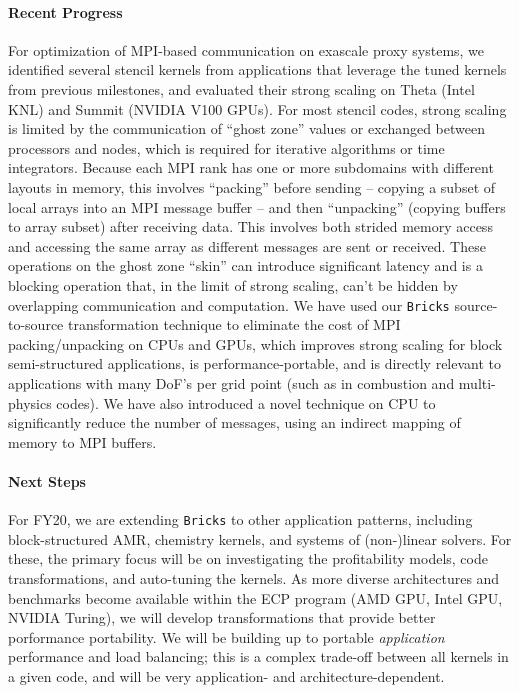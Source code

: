 \paragraph{Recent Progress}
For optimization of MPI-based communication on exascale proxy systems, 
  we identified several stencil kernels from applications that
  leverage the tuned kernels from previous milestones, and evaluated their
  strong scaling on Theta (Intel KNL) and Summit (NVIDIA V100 GPUs). 
For most stencil codes, strong scaling is
  limited by the communication of ``ghost zone'' values or exchanged between
  processors and nodes, which is required for iterative algorithms or time
  integrators. 
Because each MPI rank has one or more subdomains with different layouts 
  in memory, this involves ``packing'' before sending – copying a subset of
  local arrays into an MPI message buffer – and then ``unpacking'' 
  (copying buffers to array subset) after receiving data. 
This involves both strided memory access
  and accessing the same array as different messages are sent or received. 
These operations on the ghost zone ``skin'' can introduce significant latency 
  and is a blocking operation that, in the limit of strong scaling, 
  can’t be hidden by overlapping communication and computation. 
We have used our \texttt{Bricks} source-to-source transformation technique to 
  eliminate the cost of MPI packing/unpacking on CPUs and GPUs, which 
  improves strong scaling for block semi-structured applications, is 
  performance-portable, and is directly relevant to applications with many 
  DoF’s per grid point (such as in combustion and multi-physics codes). 
We have also introduced a novel technique on CPU to
  significantly reduce the number of messages, using an indirect mapping 
  of memory to MPI buffers. 


\paragraph{Next Steps}
For FY20, we are extending \texttt{Bricks} to other
  application patterns, including block-structured AMR, chemistry kernels,
  and systems of (non-)linear solvers.
For these, the primary focus will be on investigating the profitability
  models, code transformations, and auto-tuning the kernels.
As more diverse architectures and benchmarks become available within 
  the ECP program (AMD GPU, Intel GPU, NVIDIA Turing), we will develop 
  transformations that provide better porformance portability.
We will be building up to portable \textit{application} performance 
  and load balancing; this is a complex trade-off between all kernels in
  a given code, and will be very application- and architecture-dependent.

  

%
